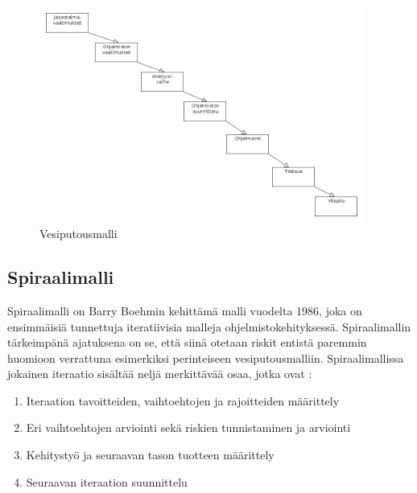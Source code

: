 \documentclass[finnish,nonumbib,nocopyright]{gradu2}
\begin{document}
\begin{figure}
\centering
\includegraphics[width=0.95\textwidth]{vesiputous}
\caption{Vesiputousmalli \cite{managing}}
\end{figure}

\subsection{Spiraalimalli}

Spiraalimalli on Barry Boehmin kehittämä \cite{spiral} malli vuodelta 1986, joka on ensimmäisiä tunnettuja iteratiivisia malleja ohjelmistokehityksessä. Spiraalimallin tärkeimpänä ajatuksena on se, että siinä otetaan riskit entistä paremmin huomioon verrattuna esimerkiksi perinteiseen vesiputousmalliin. Spiraalimallissa jokainen iteraatio sisältää neljä merkittävää osaa, jotka ovat \cite{spiral}:
\begin{enumerate}
\item Iteraation tavoitteiden, vaihtoehtojen ja rajoitteiden määrittely
\item Eri vaihtoehtojen arviointi sekä riskien tunnistaminen ja arviointi
\item Kehitystyö ja seuraavan tason tuotteen määrittely
\item Seuraavan iteraation suunnittelu
\end{enumerate}
\end{document}
